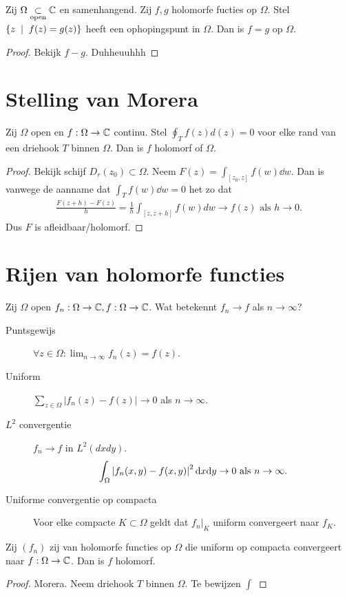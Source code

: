 \begin{stelling}
	[Identiteitsstelling]
	Zij $\Omega \underset{\text{open}}{\subset} \mathbb{C}$ en samenhangend. Zij $f, g$ holomorfe fucties op $\Omega$. 
	Stel $\{z \st f(z) = g(z)\} $ heeft een ophopingspunt in $\Omega$. Dan is $f = g$ op $\Omega$.
\end{stelling}
\begin{proof}
	Bekijk $f - g$. Duhheuuhhh
\end{proof}

\section{Stelling van Morera} \label{sec:stelling_van_morera}
\begin{stelling}
	Zij $\Omega$ open en $f: \Omega \to \mathbb{C}$ continu.
Stel $\oint_T f(z) d(z) = 0$ voor elke rand van een driehook $T$ binnen $\Omega$.  Dan is $f$ holomorf of $\Omega$. 
\end{stelling}
\begin{proof}
	Bekijk schijf  $D_r(z_0) \subset \Omega$. 
	Neem $F(z) = \int_{[z_0, z]} f(w) \dd w$.
	Dan is vanwege de aanname dat $\int_{T} f(w) \dd w = 0$ het zo dat
	\begin{align*}
		\frac{F(z+h) - F(z)}{h} = \frac{1}{h} \int_{[z, z+h]}f(w) dw \to f(z) \text{ als } h \to 0
	.\end{align*}
	Dus $F$ is afleidbaar/holomorf.
\end{proof}

\section{Rijen van holomorfe functies} \label{sec:rijen_van_holomorfe_functies}
Zij $\Omega$ open $f_n: \Omega \to \mathbb{C}, f: \Omega \to \mathbb{C}$.
Wat betekennt $f_n \to f $ als $n \to \infty$?
\begin{description}
	\item[Puntsgewijs] $\forall z \in \Omega: \lim_{n \to \infty}f_n(z) = f(z)$.
	\item[Uniform] $\sum_{z \in \Omega}|f_n(z) - f(z)| \to 0$ als $n\to \infty$.
	\item[$L^2$ convergentie] $f_n \to f $ in $L^2(dx dy)$. \[
			\int_{\Omega} \left| f_n(x, y) - f(x, y) \right|^2 \mathrm{d} x \mathrm{d} y \to 0 \text{ als } n \to \infty
.\]
\item[Uniforme convergentie op compacta] Voor elke compacte $K \subset \Omega$ geldt dat $f_n|_K$ uniform convergeert naar $f_K$.
\end{description}
\begin{stelling}
	Zij $(f_n)$ zij van holomorfe functies op $\Omega$ die uniform op compacta convergeert naar $f:\Omega \to \mathbb{C}$. Dan is $f$ holomorf.
\end{stelling}
\begin{proof}
	Morera. Neem driehook $T$ binnen $\Omega$. 
	Te bewijzen $\int_{}$
\end{proof}

